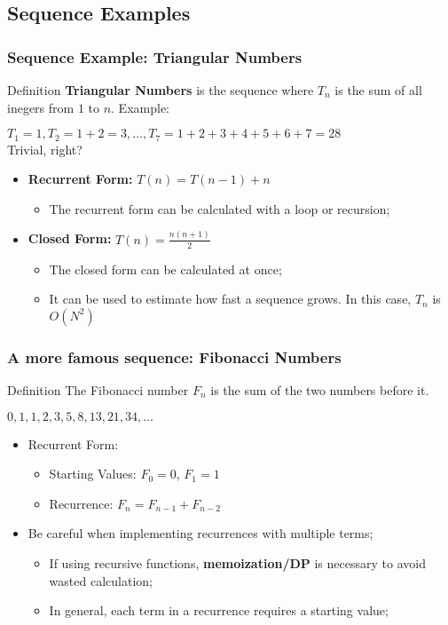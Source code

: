 \subsection{Sequence Examples}
\begin{frame}
  \frametitle{Sequence Example: Triangular Numbers}
  \begin{block}{Definition}
    {\bf Triangular Numbers} is the sequence where $T_n$ is the sum of all inegers from $1$ to $n$. Example:\medskip

    $T_1=1, T_2=1+2=3, \ldots, T_7=1+2+3+4+5+6+7=28$\\
    Trivial, right?
  \end{block}\bigskip

  \begin{itemize}
    \item {\bf Recurrent Form:} $T(n) = T(n-1) + n$
    \begin{itemize}
      \item The recurrent form can be calculated with a loop or recursion;
    \end{itemize}\bigskip
    \item {\bf Closed Form:} $T(n) = \frac{n(n+1)}{2}$
    \begin{itemize}
      \item The closed form can be calculated at once;
      \item It can be used to estimate how fast a sequence grows. In this case, $T_n$ is $O(N^2)$
    \end{itemize}
  \end{itemize}
\end{frame}

\begin{frame}
  \frametitle{A more famous sequence: Fibonacci Numbers}

  \begin{block}{Definition}
    The Fibonacci number $F_n$ is the sum of the two numbers before it.\medskip

    $0, 1, 1, 2, 3, 5, 8, 13, 21, 34, \ldots$
  \end{block}\bigskip

  \begin{itemize}
    \item Recurrent Form:
    \begin{itemize}
      \item Starting Values: $F_0 = 0$, $F_1 = 1$
      \item Recurrence: $F_n = F_{n-1} + F_{n-2}$
    \end{itemize}\bigskip

    \item Be careful when implementing recurrences with multiple terms;
    \begin{itemize}
      \item If using recursive functions, {\bf memoization/DP} is necessary to avoid wasted calculation;
      \item In general, each term in a recurrence requires a starting value;
    \end{itemize}
  \end{itemize}
\end{frame}

